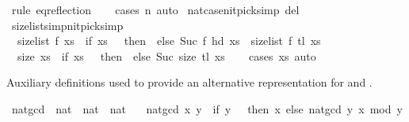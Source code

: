 \begin{isabellebody}
\ {\isacharparenleft}{\kern0pt}rule\ eq{\isacharunderscore}{\kern0pt}reflection{\isacharparenright}{\kern0pt}\isanewline
\ \ \isamarkupfalse%
\ {\isacharparenleft}{\kern0pt}cases\ n{\isacharparenright}{\kern0pt}\ auto%
\endisatagproof
{\isafoldproof}%
%
\isadelimproof
\isanewline
%
\endisadelimproof
\isanewline
{}\isamarkupfalse%
\ nat{\isachardot}{\kern0pt}case{\isacharbrackleft}{\kern0pt}nitpick{\isacharunderscore}{\kern0pt}simp\ del{\isacharbrackright}{\kern0pt}\isanewline
\isanewline
{}\isamarkupfalse%
\ size{\isacharunderscore}{\kern0pt}list{\isacharunderscore}{\kern0pt}simp{\isacharbrackleft}{\kern0pt}nitpick{\isacharunderscore}{\kern0pt}simp{\isacharbrackright}{\kern0pt}{\isacharcolon}{\kern0pt}\isanewline
\ \ {\isachardoublequoteopen}size{\isacharunderscore}{\kern0pt}list\ f\ xs\ {\isacharequal}{\kern0pt}\ {\isacharparenleft}{\kern0pt}if\ xs\ {\isacharequal}{\kern0pt}\ {\isacharbrackleft}{\kern0pt}{\isacharbrackright}{\kern0pt}\ then\ {}\ else\ Suc\ {\isacharparenleft}{\kern0pt}f\ {\isacharparenleft}{\kern0pt}hd\ xs{\isacharparenright}{\kern0pt}\ {\isacharplus}{\kern0pt}\ size{\isacharunderscore}{\kern0pt}list\ f\ {\isacharparenleft}{\kern0pt}tl\ xs{\isacharparenright}{\kern0pt}{\isacharparenright}{\kern0pt}{\isacharparenright}{\kern0pt}{\isachardoublequoteclose}\isanewline
\ \ {\isachardoublequoteopen}size\ xs\ {\isacharequal}{\kern0pt}\ {\isacharparenleft}{\kern0pt}if\ xs\ {\isacharequal}{\kern0pt}\ {\isacharbrackleft}{\kern0pt}{\isacharbrackright}{\kern0pt}\ then\ {}\ else\ Suc\ {\isacharparenleft}{\kern0pt}size\ {\isacharparenleft}{\kern0pt}tl\ xs{\isacharparenright}{\kern0pt}{\isacharparenright}{\kern0pt}{\isacharparenright}{\kern0pt}{\isachardoublequoteclose}\isanewline
%
\isadelimproof
\ \ %
\endisadelimproof
%
\isatagproof
{}\isamarkupfalse%
\ {\isacharparenleft}{\kern0pt}cases\ xs{\isacharparenright}{\kern0pt}\ auto%
\endisatagproof
{\isafoldproof}%
%
\isadelimproof
%
\endisadelimproof
%
\begin{isamarkuptext}%
Auxiliary definitions used to provide an alternative representation for
 and .%
\end{isamarkuptext}\isamarkuptrue%
\isamarkupfalse%
\ nat{\isacharunderscore}{\kern0pt}gcd\ {\isacharcolon}{\kern0pt}{\isacharcolon}{\kern0pt}\ {\isachardoublequoteopen}nat\ {\isasymRightarrow}\ nat\ {\isasymRightarrow}\ nat{\isachardoublequoteclose}\ \isanewline
\ \ {\isachardoublequoteopen}nat{\isacharunderscore}{\kern0pt}gcd\ x\ y\ {\isacharequal}{\kern0pt}\ {\isacharparenleft}{\kern0pt}if\ y\ {\isacharequal}{\kern0pt}\ {}\ then\ x\ else\ nat{\isacharunderscore}{\kern0pt}gcd\ y\ {\isacharparenleft}{\kern0pt}x\ mod\ y{\isacharparenright}{\kern0pt}{\isacharparenright}{\kern0pt}{\isachardoublequoteclose}\isanewline

\end{isabellebody}
